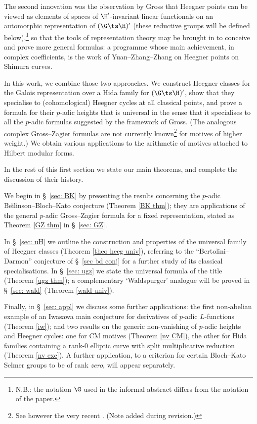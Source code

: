 The second innovation was the observation  by Gross \cite{gross-msri} that Heegner points can be viewed as elements of spaces of $\H'$-invariant linear functionals on an  automorphic representation of $(\G\ts\H)'$ (these reductive groups will be defined below),\footnote{N.B.: the notation $\G$ used in the informal abstract differs from the notation of the paper.}
 so that the tools of representation theory may be brought in to conceive and prove more  general formulas: a programme whose main achievement, in complex coefficients,  is the work of Yuan--Zhang--Zhang \cite{yzz} on Heegner points on Shimura curves.



In this  work, we combine those two approaches. We construct  Heegner classes for the Galois representation over a Hida family for $(\G\ts\H)'$, show that they specialise to  (cohomological) Heegner cycles at all classical points, and prove a formula for their $p$-adic heights that is universal in the sense that it specialises to all the $p$-adic formulas suggested by the framework of Gross. (The analogous complex Gross--Zagier formulas  are not currently known\footnote{See however the very recent \cite{Qiu}. (Note added during revision.)}  for motives of higher weight.)
 We obtain various applications to the arithmetic of motives attached to Hilbert modular forms.








In the rest of this first section we state our main theorems, and complete the discussion of their history.

We begin in \S~\ref{sec: BK} by  presenting  the results concerning the $p$-adic  {Be\u\i linson}--Bloch--Kato conjecture
(Theorem \ref{BK thm}); they are applications of  the  general $p$-adic Gross--Zagier formula for a fixed representation, stated as
 Theorem \ref{GZ thm} in \S~\ref{sec: GZ}.


In \S~\ref{sec: uH} we outline the construction and properties of the universal  family of Heegner classes (Theorem \ref{theo heeg univ}), referring to the ``Bertolini--Darmon'' conjecture of \S~\ref{sec bd conj} for a further study of its classical specialisations.  In \S~\ref{sec: ugz}  we state the universal  formula  of the title (Theorem \ref{ugz thm}); a complementary `Waldspurger' analogue will be proved in \S~\ref{sec: wald} (Theorem \ref{wald univ}).

  Finally, in \S~\ref{sec: appl} we discuss some further applications:  the first non-abelian example of an Iwasawa main conjecture for  derivatives of $p$-adic $L$-functions (Theorem \ref{iw}); and two results on the generic non-vanishing of $p$-adic heights and Heegner cycles: one for CM motives (Theorem \ref{nv CM}), the other for Hida families containing a rank-$0$ elliptic curve with split multiplicative reduction (Theorem \ref{nv exc}).
   A further application, to a criterion for certain Bloch--Kato Selmer groups to be of rank \emph{zero}, will appear separately.




